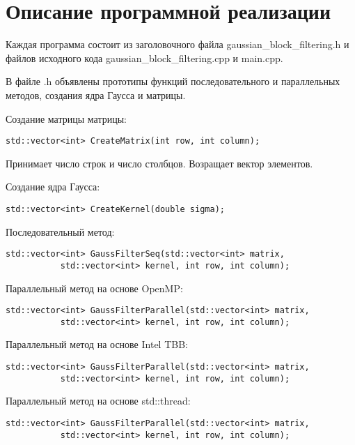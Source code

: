 \documentclass{report}
\begin{document}
\section*{Описание программной реализации}
Каждая программа состоит из заголовочного файла gaussian\_block\_filtering.h и файлов исходного кода gaussian\_block\_filtering.cpp и main.cpp.
\par В файле .h объявлены прототипы функций последовательного и параллельных методов, создания ядра Гаусса и матрицы.
\par Создание матрицы матрицы:
\begin{lstlisting}
std::vector<int> CreateMatrix(int row, int column);
\end{lstlisting}
Принимает число строк и число столбцов. Возращает вектор элементов.
\par Создание ядра Гаусса:
\begin{lstlisting}
std::vector<int> CreateKernel(double sigma);
\end{lstlisting}
\par Последовательный метод:
\begin{lstlisting}
std::vector<int> GaussFilterSeq(std::vector<int> matrix,
           std::vector<int> kernel, int row, int column);
\end{lstlisting}
\par Параллельный метод на основе OpenMP:
\begin{lstlisting}
std::vector<int> GaussFilterParallel(std::vector<int> matrix,
           std::vector<int> kernel, int row, int column);
\end{lstlisting}
\par Параллельный метод на основе Intel TBB:
\begin{lstlisting}
std::vector<int> GaussFilterParallel(std::vector<int> matrix,
           std::vector<int> kernel, int row, int column);
\end{lstlisting}
\par Параллельный метод на основе std::thread:
\begin{lstlisting}
std::vector<int> GaussFilterParallel(std::vector<int> matrix,
           std::vector<int> kernel, int row, int column);
\end{lstlisting}

\newpage

\end{document}
